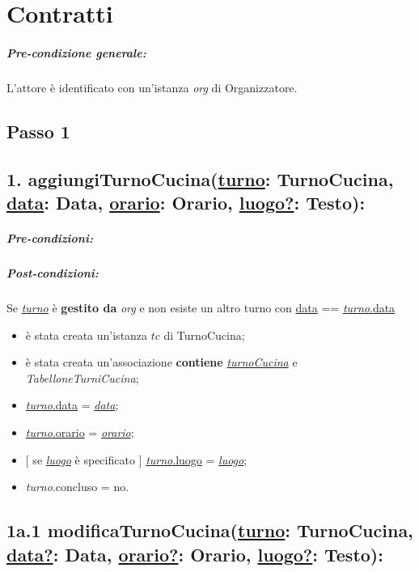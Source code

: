 \chapter{Contratti}
\paragraph{Pre-condizione generale:} L'attore è identificato con un'istanza \textit{org} di Organizzatore.

\section{Passo 1}
\section*{1. aggiungiTurnoCucina(\underline{turno}: TurnoCucina, \underline{data}: Data, \underline{orario}: Orario, \underline{luogo?}: Testo):}

\paragraph{Pre-condizioni:} 


\paragraph{Post-condizioni:} Se \underline{\textit{turno}} è \textbf{gestito da} \textit{org} e non esiste un altro turno con \underline{data} == \underline{\textit{turno}.data} 

\begin{itemize}
    \item è stata creata un'istanza $tc$ di TurnoCucina;
    \item è stata creata un'associazione \textbf{contiene} \underline{\textit{turnoCucina}} e \textit{TabelloneTurniCucina};
    \item \underline{\textit{turno}.data} = \underline{\textit{data}};
    \item \underline{\textit{turno}.orario} = \underline{\textit{orario}};
    \item $[$ se \underline{\textit{luogo}} è specificato $]$ \underline{\textit{turno}.luogo} = \underline{\textit{luogo}};
    \item \textit{turno}.concluso  = no.
\end{itemize}

\section*{1a.1 modificaTurnoCucina(\underline{turno}: TurnoCucina, \underline{data?}: Data, \underline{orario?}: Orario, \underline{luogo?}: Testo):}

